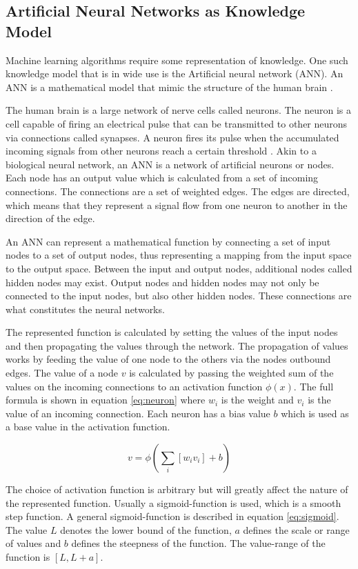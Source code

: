 \subsection{Artificial Neural Networks as Knowledge Model}
Machine learning algorithms require some representation of knowledge. One such knowledge model that is in wide use is the Artificial neural network (ANN). An ANN is a mathematical model that mimic the structure of the human brain \cite{haykin}. 

The human brain is a large network of nerve cells called neurons. The neuron is a cell capable of firing an electrical pulse that can be transmitted to other neurons via connections called synapses. A neuron fires its pulse when the accumulated incoming signals from other neurons reach a certain threshold \cite{haykin}. Akin to a biological neural network, an ANN is a network of artificial neurons or nodes. Each node has an output value which is calculated from a set of incoming connections. The connections are a set of weighted edges. The edges are directed, which means that they represent a signal flow from one neuron to another in the direction of the edge.

An ANN can represent a mathematical function by connecting a set of input nodes to a set of output nodes, thus representing a mapping from the input space to the output space. Between the input and output nodes, additional nodes called hidden nodes may exist. Output nodes and hidden nodes may not only be connected to the input nodes, but also other hidden nodes. These connections are what constitutes the neural networks. 

The represented function is calculated by setting the values of the input nodes and then propagating the values through the network. The propagation of values works by feeding the value of one node to the others via the nodes outbound edges. The value of a node $v$ is calculated by passing the weighted sum of the values on the incoming connections to an activation function $\phi(x)$. The full formula is shown in equation \ref{eq:neuron} where $w_i$ is the weight and $v_i$ is the value of an incoming connection. Each neuron has a bias value $b$ which is used as a base value in the activation function.  

\begin{equation}
    v = \phi (\sum_i{[w_i v_i]} + b)
    \label{eq:neuron}
\end{equation}


\noindent
The choice of activation function is arbitrary but will greatly affect the nature of the represented function. Usually a sigmoid-function is used, which is a smooth step function. A general sigmoid-function is described in equation \ref{eq:sigmoid}. The value $L$ denotes the lower bound of the function, $a$ defines the scale or range of values and $b$ defines the steepness of the function. The value-range of the function is $[L, L+a]$.  

